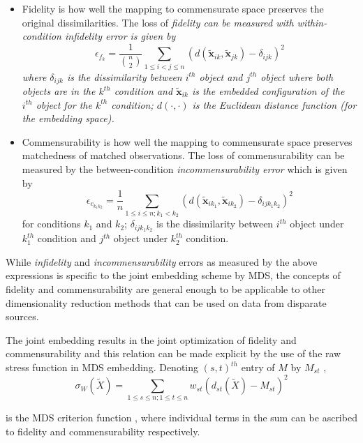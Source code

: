 \documentclass[11pt]{article} %
\begin{document}
\begin{itemize}
\item Fidelity is how well the mapping to commensurate space preserves the original dissimilarities. The loss of \em{fidelity} can be measured with  within-condition \em{ infidelity error} is given by
    \[
\epsilon_{f_{k}} = \frac{1}{{{n}\choose{2}}} \sum_{1 \leq i < j \leq n} (d(\widetilde{\bm{x}}_{ik},\widetilde{\bm{x}}_{jk})-\delta_{ijk})^2
\] 
where $\delta_{ijk}$ is the dissimilarity between $i^{th}$ object and $j^{th}$ object where both objects are in the $k^{th}$  condition and $\widetilde{\bm{x}}_{ik}$ is the embedded configuration of the $i^{th}$ object  for the $k^{th}$ condition;  $d(\cdot,\cdot)$ is the Euclidean distance function (for the embedding space).

\item Commensurability is how well the mapping to commensurate space preserves matchedness of matched observations. The loss of commensurability can be measured by the between-condition {\em incommensurability error} which is given by
    \[
\epsilon_{c_{k_1k_2}} = \frac{1}{n} \sum_{1 \leq i \leq n;k_1 <k_2} (d(\widetilde{\bm{x}}_{ik_1},\widetilde{\bm{x}}_{ik_2})- { \delta_{ijk_1k_2}})^2
\label{comm-error}
\]
 for conditions $k_1$ and $k_2$; $\delta_{ijk_1k_2}$  is the dissimilarity between $i^{th}$ object under  $k_1^{th}$ condition  and $j^{th}$ object under $k_2^{th}$ condition.
\end{itemize}

While  \emph{infidelity} and  \emph{incommensurability} errors as measured by the above expressions is specific to the joint embedding scheme by MDS, the concepts of fidelity and commensurability are  general enough to be applicable to other dimensionality reduction methods that can be used on data from disparate sources.



The joint embedding results in the joint optimization of fidelity and commensurability and this relation can be made explicit by the use of the raw stress function in MDS embedding. Denoting  $(s,t)^{th}$ entry of $M$ by $M_{st}$ ,
\begin{equation}
\sigma_{W}(\widetilde{X})=\sum_{1\leq s\leq n;1\leq t\leq n} {w_{st}(d_{st}(\widetilde{X})-M_{st})^2  }\label{raw-stress}
\end{equation}

is the MDS criterion function , where individual terms in the sum can be ascribed to fidelity and commensurability respectively. %
\end{document}

